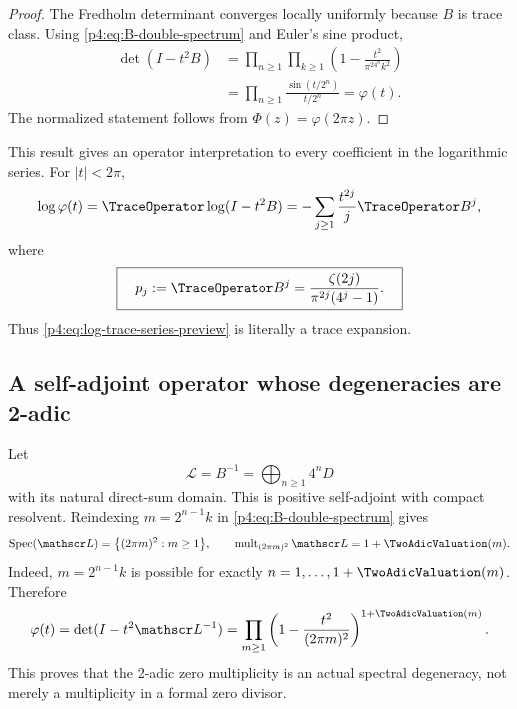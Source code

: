 \documentclass[11pt]{article}
\theoremstyle{definition}
\theoremstyle{remark}
\newcommand{\Spec}{\operatorname{Spec}}
\newcommand{\PhiF}{\Phi}
\newcommand{\phiF}{\varphi}
\begin{document}
\begin{proof}
The Fredholm determinant converges locally uniformly because \(B\) is trace class.
Using \eqref{p4:eq:B-double-spectrum} and Euler's sine product,
\begin{align*}
 \det(I-t^2B)
 &=\prod_{n\ge1}\prod_{k\ge1}
   \left(1-\frac{t^2}{\pi^24^nk^2}\right)\\
 &=\prod_{n\ge1}\frac{\sin(t/2^n)}{t/2^n}
 =\phiF(t).
\end{align*}
The normalized statement follows from \(\PhiF(z)=\phiF(2\pi z)\).
\end{proof}

This result gives an operator interpretation to every coefficient in the logarithmic
series.  For \(|t|<2\pi\),
\begin{equation}
 \log\phiF(t)=\TraceOperator\log(I-t^2B)
 =-\sum_{j\ge1}\frac{t^{2j}}j\TraceOperator B^j,
 \label{p4:eq:operator-log}
\end{equation}
where
\begin{equation}
 \boxed{\quad
 p_j:=\TraceOperator B^j
 =\frac{\zeta(2j)}{\pi^{2j}(4^j-1)}.
 \quad}
 \label{p4:eq:power-traces}
\end{equation}
Thus \eqref{p4:eq:log-trace-series-preview} is literally a trace expansion.

\subsection{A self-adjoint operator whose degeneracies are 2-adic}

Let
\begin{equation}
 \mathscr L=B^{-1}
 =\bigoplus_{n\ge1}4^nD
 \label{p4:eq:L-operator}
\end{equation}
with its natural direct-sum domain.  This is positive self-adjoint with compact
resolvent.  Reindexing \(m=2^{n-1}k\) in \eqref{p4:eq:B-double-spectrum} gives
\begin{equation}
 \Spec(\mathscr L)=
 \bigl\{(2\pi m)^2:m\ge1\bigr\},
 \qquad
 \operatorname{mult}_{(2\pi m)^2}\mathscr L=1+\TwoAdicValuation(m).
 \label{p4:eq:L-spectrum}
\end{equation}
Indeed, \(m=2^{n-1}k\) is possible for exactly
\(n=1,\ldots,1+\TwoAdicValuation(m)\).  Therefore
\begin{equation}
 \phiF(t)=\det(I-t^2\mathscr L^{-1})
 =\prod_{m\ge1}\left(1-\frac{t^2}{(2\pi m)^2}\right)^{1+\TwoAdicValuation(m)}.
 \label{p4:eq:angular-canonical}
\end{equation}
This proves that the 2-adic zero multiplicity is an actual spectral degeneracy, not
merely a multiplicity in a formal zero divisor.
\end{document}
